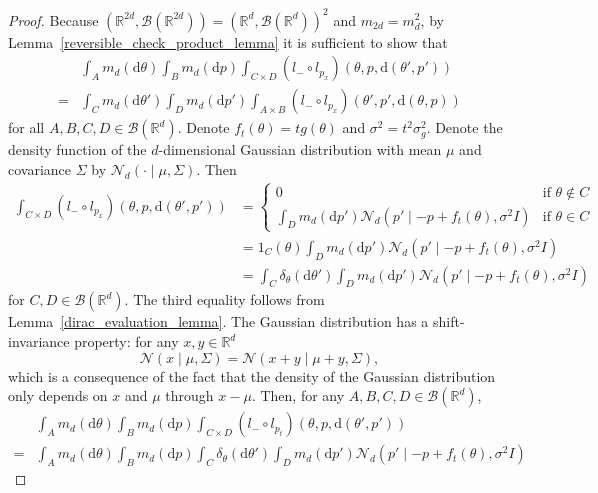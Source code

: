 \documentclass[english,twoside,openright]{HYgraduMLDS}
\newcommand{\R}{\mathbb{R}}
\newcommand{\dx}{\mathrm{d}}
\newcommand{\caln}{{\mathcal{N}}}
\begin{document}
\begin{proof}
  Because \((\R^{2d}, \mathcal{B}(\R^{2d})) = (\R^{d}, \mathcal{B}(\R^{d}))^{2}\)
  and \(m_{2d} = m_{d}^{2}\), by
  Lemma~\ref{reversible_check_product_lemma} it is sufficient to show that
  \begin{align*}
    &\int_{A}m_{d}(\dx \theta)\int_{B}m_{d}(\dx p)
    \int_{C\times D}(l_{-}\circ l_{p_{x}})(\theta, p, \dx (\theta', p'))
    \\= &\int_{C}m_{d}(\dx \theta')\int_{D}m_{d}(\dx p')
    \int_{A\times B}(l_{-}\circ l_{p_{x}})(\theta', p', \dx (\theta, p))
  \end{align*}
  for all \(A, B, C, D\in \mathcal{B}(\R^{d})\).
  Denote \(f_{t}(\theta) = t g(\theta)\) and
  \(\sigma^{2} = t^{2}\sigma_{g}^{2}\). Denote the density function
  of the \(d\)-dimensional Gaussian distribution with mean \(\mu\) and covariance
  \(\Sigma\) by \(\caln_{d}(\cdot \mid \mu, \Sigma)\).
  Then
  \begin{align}
    \int_{C\times D}(l_{-}\circ l_{p_{x}})(\theta, p, \dx(\theta', p'))
    &= \begin{cases}
         0 &\text{if } \theta \notin C \\
         \int_{D}m_{d}(\dx p')\caln_{d}(p'\mid -p + f_{t}(\theta), \sigma^{2}I)
         & \text{if } \theta \in C
    \end{cases}
    \\&= 1_{C}(\theta)\int_{D}m_{d}(\dx p')\caln_{d}(p'\mid -p + f_{t}(\theta), \sigma^{2}I)
      \label{leapfrog_p_update_equality_2}
    \\&= \int_{C}\delta_{\theta}(\dx \theta')
      \int_{D}m_{d}(\dx p')\caln_{d}(p'\mid -p + f_{t}(\theta), \sigma^{2}I)
      \label{leapfrog_p_update_equality_1}
  \end{align}
  for \(C, D\in \mathcal{B}(\R^{d})\). The third equality follows from
  Lemma~\ref{dirac_evaluation_lemma}.
  The Gaussian distribution has a shift-invariance property: for any \(x, y\in \R^{d}\)
  \[
    \caln(x\mid \mu, \Sigma) = \caln(x + y\mid \mu + y, \Sigma),
  \]
  which is a consequence of the fact that the density of the Gaussian distribution
  only depends on \(x\) and \(\mu\) through \(x - \mu\).
  Then,
  for any \(A, B, C, D\in \mathcal{B}(\R^{d})\),
	\begin{align*}
    &\int_{A}m_{d}(\dx\theta)\int_{B}m_{d}(\dx p)\int_{C\times D}
      (l_{-}\circ l_{p_{t}})(\theta, p, \dx(\theta', p'))
    \\=& \int_{A}m_{d}(\dx \theta)\int_{B}m_{d}(\dx p)\int_{C}\delta_{\theta}(\dx \theta')
         \int_{D}m_{d}(\dx p') \caln_{d}(p'\mid -p + f_{t}(\theta), \sigma^{2}I)

\end{align*}
\end{proof}
\end{document}
